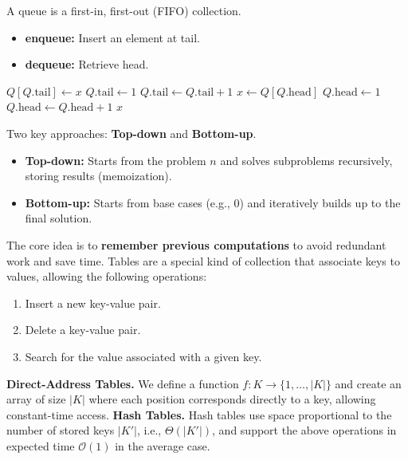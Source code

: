 \documentclass[a4paper,landscape]{article}
\begin{document}
\begin{multicols}{7}
\endtcolorbox
\tcolorbox[mybox={Queue}]
A queue is a first-in, first-out (FIFO) collection.
\begin{itemize}[noitemsep,itemsep=0pt]
    \item \textbf{enqueue:} Insert an element at tail.
    \item \textbf{dequeue:} Retrieve head.
\end{itemize}
\begin{algorithmic}[1]
        \State $Q[Q.\text{tail}] \gets x$
            \State $Q.\text{tail} \gets 1$
        \Else
            \State $Q.\text{tail} \gets Q.\text{tail} + 1$
        \EndIf
    \EndProcedure
    \State
        \State $x \gets Q[Q.\text{head}]$
            \State $Q.\text{head} \gets 1$
        \Else
            \State $Q.\text{head} \gets Q.\text{head} + 1$
        \EndIf
        \State \Return $x$
    \EndProcedure
\end{algorithmic}
\endtcolorbox
\tcolorbox[mybox={Dynamic Programming}]
Two key approaches: \textbf{Top-down} and \textbf{Bottom-up}.
\begin{itemize}[noitemsep, itemsep=0pt]
    \item \textbf{Top-down:} Starts from the problem $n$ and solves subproblems recursively, storing results (memoization).
    \item \textbf{Bottom-up:} Starts from base cases (e.g., 0) and iteratively builds up to the final solution.
\end{itemize}
The core idea is to \textbf{remember previous computations} to avoid redundant work and save time.
\endtcolorbox
\tcolorbox[mybox={Hash Functions and Tables}]
Tables are a special kind of collection that associate keys to values, allowing the following operations:
\begin{enumerate}[noitemsep, topsep=0pt]
    \item Insert a new key-value pair.
    \item Delete a key-value pair.
    \item Search for the value associated with a given key.
\end{enumerate}
\noindent\textbf{Direct-Address Tables.}  
We define a function $f : K \rightarrow \{1, \dots, |K|\}$ and create an array of size $|K|$ where each position corresponds directly to a key, allowing constant-time access.
\noindent\textbf{Hash Tables.}  
Hash tables use space proportional to the number of stored keys $|K'|$, i.e., $\Theta(|K'|)$, and support the above operations in expected time $\mathcal{O}(1)$ in the average case.  

\end{multicols}
\end{document}
